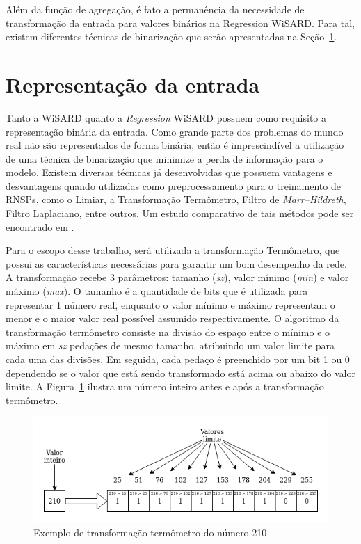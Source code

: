     Além da função de agregação, é fato a permanência da necessidade de transformação da entrada para valores binários na Regression WiSARD. Para tal, existem diferentes técnicas de binarização que serão apresentadas na Seção~\ref{sec:input_repr}.

\section{Representação da entrada} \label{sec:input_repr}
    Tanto a WiSARD quanto a \textit{Regression} WiSARD possuem como requisito a representação binária da entrada. Como grande parte dos problemas do mundo real não são representados de forma binária, então é imprescindível a utilização de uma técnica de binarização que minimize a perda de informação para o modelo. Existem diversas técnicas já desenvolvidas que possuem vantagens e desvantagens quando utilizadas como preprocessamento para o treinamento de RNSPs, como o Limiar, a Transformação Termômetro, Filtro de \textit{Marr–Hildreth}, Filtro Laplaciano, entre outros. Um estudo comparativo de tais métodos pode ser encontrado em \cite{binenctec}.
    
    Para o escopo desse trabalho, será utilizada a transformação Termômetro, que possui as características necessárias para garantir um bom desempenho da rede. A transformação recebe 3 parâmetros: tamanho (\textit{sz}), valor mínimo (\textit{min}) e valor máximo (\textit{max}). O tamanho é a quantidade de bits que é utilizada para representar 1 número real, enquanto o valor mínimo e máximo representam o menor e o maior valor real possível assumido respectivamente. O algoritmo da transformação termômetro consiste na divisão do espaço entre o mínimo e o máximo em \textit{sz} pedações de mesmo tamanho, atribuindo um valor limite para cada uma das divisões. Em seguida, cada pedaço é preenchido por um bit 1 ou 0 dependendo se o valor que está sendo transformado está acima ou abaixo do valor limite. A Figura~\ref{fig:therm_ex} ilustra um número inteiro antes e após a transformação termômetro.
    
    \begin{figure}[!ht] \label{fig:therm_ex}
    \centering
    \includegraphics[width=5.0in]{img/therm_example.png}
    \caption{Exemplo de transformação termômetro do número 210}
    \end{figure}

